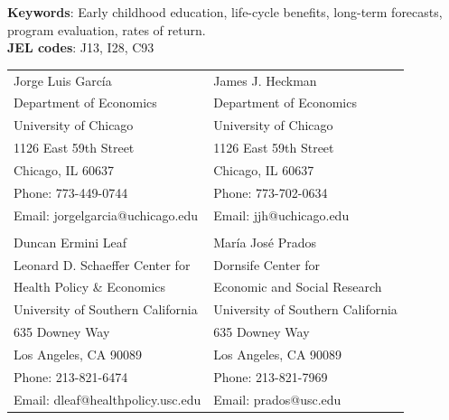 \noindent \textbf{Keywords}: Early childhood education, life-cycle benefits, long-term forecasts, program evaluation, rates of return. \\
\noindent \textbf{JEL codes}: J13, I28, C93\\


\bigskip
\begin{tabular}{ll}
Jorge Luis Garc\'{i}a                                          & James J. Heckman \\
Department of Economics                                 & Department of Economics \\
University of Chicago                                        & University of Chicago \\
1126 East 59th Street                                       & 1126 East 59th Street \\
Chicago, IL 60637                                             & Chicago, IL 60637 \\
Phone: 773-449-0744                                       & Phone: 773-702-0634  \\
Email: jorgelgarcia@uchicago.edu                    & Email: jjh@uchicago.edu \\
                                                                          & \\
Duncan Ermini Leaf                                           & Mar\'{i}a Jos\'{e} Prados \\
Leonard D. Schaeffer Center for                       & Dornsife Center for  \\
Health Policy \& Economics                              & Economic and Social Research \\
University of Southern California                       & University of Southern California \\
635 Downey Way                                              & 635 Downey Way        \\
Los Angeles, CA 90089                                    & Los Angeles, CA 90089 \\
Phone: 213-821-6474                                       & Phone: 213-821-7969 \\
Email: dleaf@healthpolicy.usc.edu                     & Email: prados@usc.edu \\

\end{tabular}

\clearpage

\restoregeometry
\doublespacing
\setcounter{page}{1}

